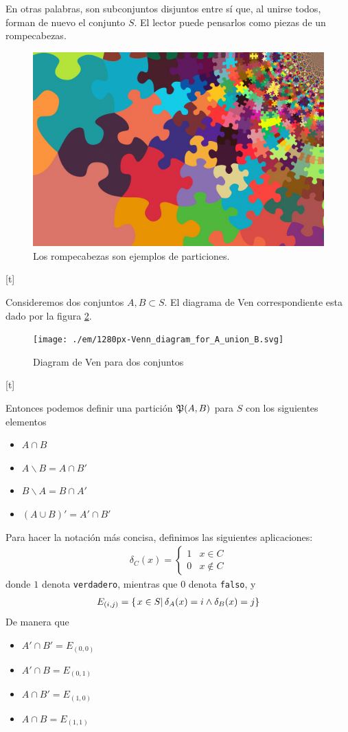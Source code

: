 En otras palabras, son subconjuntos disjuntos entre sí que, al unirse todos, forman de nuevo el conjunto $ S $. El lector puede pensarlos como piezas de un rompecabezas.

\begin{figure}[t]
	\centering
	\includegraphics[width=0.7\linewidth]{./em/puzzle-5294291_1280}
	\caption[Rompecabezas]{Los rompecabezas son ejemplos de particiones.}
	\label{fig:puzzle-52942911280}
\end{figure}[t]

Consideremos dos conjuntos $ A,B \subset S$. El diagrama de Ven correspondiente esta dado por la figura \ref{fig:1280px-venndiagramforaunionb}. 

\begin{figure}[t]
	\centering
	\texttt{[image: ./em/1280px-Venn\_diagram\_for\_A\_union\_B.svg]}
	\caption{Diagram de Ven para dos conjuntos}
	\label{fig:1280px-venndiagramforaunionb}
\end{figure}[t]

Entonces podemos definir una partición $ \mathfrak{P}(A,B) $ para $ S $ con los siguientes elementos
\begin{itemize}
	\item $ A\cap B $
	\item $ A\backslash B = A \cap B'$
	\item $ B\backslash A = B \cap A'$
	\item $ \left(A\cup B\right)' = A'\cap B' $
\end{itemize}

Para hacer la notación más concisa, definimos las siguientes aplicaciones:
\begin{align*}
	\delta_C(x) = \begin{cases}
		1 & x \in C \\
		0 & x \not \in C
	\end{cases}
\end{align*}
donde $ 1 $ denota \texttt{verdadero}, mientras que $ 0 $ denota \texttt{falso}, y
\begin{align*}
	E_{(i,j)}=\left\{ \left.x\in S \right| \delta_{A}(x)=i\wedge\delta_{B}(x)=j \right\}
\end{align*}
De manera que 
\begin{itemize}
	\item $ A' \cap B' = E_{(0,0)}$
	\item $ A'  \cap B = E_{(0,1)}$
	\item $ A \cap B'  = E_{(1,0)}$
	\item $ A  \cap B  = E_{(1,1)}$
\end{itemize}

